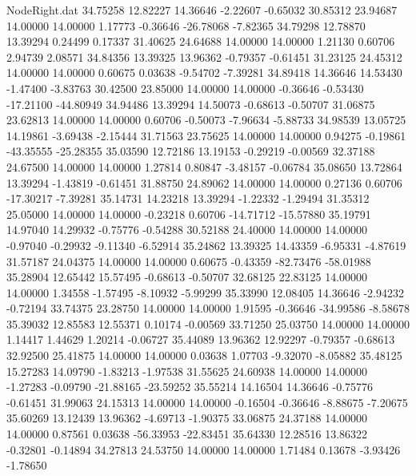 \begin{filecontents}{NodeRight.dat}
  34.75258   12.82227   14.36646    -2.22607   -0.65032   30.85312   23.94687   14.00000   14.00000    1.17773   -0.36646  -26.78068   -7.82365
  34.79298   12.78870   13.39294     0.24499    0.17337   31.40625   24.64688   14.00000   14.00000    1.21130    0.60706    2.94739    2.08571
  34.84356   13.39325   13.96362    -0.79357   -0.61451   31.23125   24.45312   14.00000   14.00000    0.60675    0.03638   -9.54702   -7.39281
  34.89418   14.36646   14.53430    -1.47400   -3.83763   30.42500   23.85000   14.00000   14.00000   -0.36646   -0.53430  -17.21100  -44.80949
  34.94486   13.39294   14.50073    -0.68613   -0.50707   31.06875   23.62813   14.00000   14.00000    0.60706   -0.50073   -7.96634   -5.88733
  34.98539   13.05725   14.19861    -3.69438   -2.15444   31.71563   23.75625   14.00000   14.00000    0.94275   -0.19861  -43.35555  -25.28355
  35.03590   12.72186   13.19153    -0.29219   -0.00569   32.37188   24.67500   14.00000   14.00000    1.27814    0.80847   -3.48157   -0.06784
  35.08650   13.72864   13.39294    -1.43819   -0.61451   31.88750   24.89062   14.00000   14.00000    0.27136    0.60706  -17.30217   -7.39281
  35.14731   14.23218   13.39294    -1.22332   -1.29494   31.35312   25.05000   14.00000   14.00000   -0.23218    0.60706  -14.71712  -15.57880
  35.19791   14.97040   14.29932    -0.75776   -0.54288   30.52188   24.40000   14.00000   14.00000   -0.97040   -0.29932   -9.11340   -6.52914
  35.24862   13.39325   14.43359    -6.95331   -4.87619   31.57187   24.04375   14.00000   14.00000    0.60675   -0.43359  -82.73476  -58.01988
  35.28904   12.65442   15.57495    -0.68613   -0.50707   32.68125   22.83125   14.00000   14.00000    1.34558   -1.57495   -8.10932   -5.99299
  35.33990   12.08405   14.36646    -2.94232   -0.72194   33.74375   23.28750   14.00000   14.00000    1.91595   -0.36646  -34.99586   -8.58678
  35.39032   12.85583   12.55371     0.10174   -0.00569   33.71250   25.03750   14.00000   14.00000    1.14417    1.44629    1.20214   -0.06727
  35.44089   13.96362   12.92297    -0.79357   -0.68613   32.92500   25.41875   14.00000   14.00000    0.03638    1.07703   -9.32070   -8.05882
  35.48125   15.27283   14.09790    -1.83213   -1.97538   31.55625   24.60938   14.00000   14.00000   -1.27283   -0.09790  -21.88165  -23.59252
  35.55214   14.16504   14.36646    -0.75776   -0.61451   31.99063   24.15313   14.00000   14.00000   -0.16504   -0.36646   -8.88675   -7.20675
  35.60269   13.12439   13.96362    -4.69713   -1.90375   33.06875   24.37188   14.00000   14.00000    0.87561    0.03638  -56.33953  -22.83451
  35.64330   12.28516   13.86322    -0.32801   -0.14894   34.27813   24.53750   14.00000   14.00000    1.71484    0.13678   -3.93426   -1.78650

\end{filecontents}

